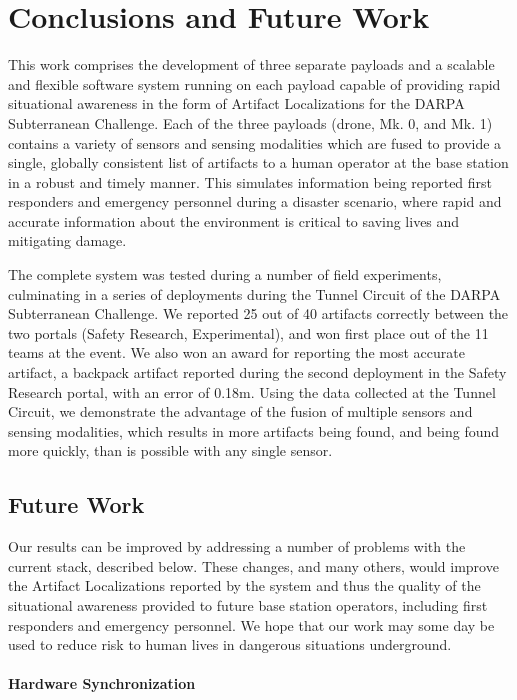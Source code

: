 \chapter{Conclusions and Future Work}

This work comprises the development of three separate payloads and a scalable and flexible software system running on each payload capable of providing rapid situational awareness in the form of Artifact Localizations for the DARPA Subterranean Challenge. Each of the three payloads (drone, Mk. 0, and Mk. 1) contains a variety of sensors and sensing modalities which are fused to provide a single, globally consistent list of artifacts to a human operator at the base station in a robust and timely manner. This simulates information being reported first responders and emergency personnel during a disaster scenario, where rapid and accurate information about the environment is critical to saving lives and mitigating damage.

The complete system was tested during a number of field experiments, culminating in a series of deployments during the Tunnel Circuit of the DARPA Subterranean Challenge. We reported 25 out of 40 artifacts correctly between the two portals (Safety Research, Experimental), and won first place out of the 11 teams at the event. We also won an award for reporting the most accurate artifact, a backpack artifact reported during the second deployment in the Safety Research portal, with an error of 0.18m. Using the data collected at the Tunnel Circuit, we demonstrate the advantage of the fusion of multiple sensors and sensing modalities, which results in more artifacts being found, and being found more quickly, than is possible with any single sensor.

\section{Future Work}

Our results can be improved by addressing a number of problems with the current stack, described below. These changes, and many others, would improve the Artifact Localizations reported by the system and thus the quality of the situational awareness provided to future base station operators, including first responders and emergency personnel. We hope that our work may some day be used to reduce risk to human lives in dangerous situations underground.

\subsubsection{Hardware Synchronization}

